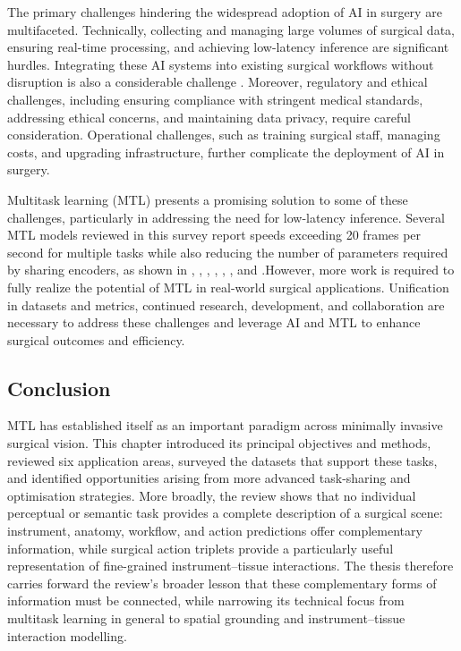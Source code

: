 The primary challenges hindering the widespread adoption of AI in surgery are multifaceted. Technically, collecting and managing large volumes of surgical data, ensuring real-time processing, and achieving low-latency inference are significant hurdles. Integrating these AI systems into existing surgical workflows without disruption is also a considerable challenge \citep{auloge2020augmented}. Moreover, regulatory and ethical challenges, including ensuring compliance with stringent medical standards, addressing ethical concerns, and maintaining data privacy, require careful consideration. Operational challenges, such as training surgical staff, managing costs, and upgrading infrastructure, further complicate the deployment of AI in surgery.

Multitask learning (MTL) presents a promising solution to some of these challenges, particularly in addressing the need for low-latency inference. Several MTL models reviewed in this survey report speeds exceeding 20 frames per second for multiple tasks while also reducing the number of parameters required by sharing encoders, as shown in , , , , , , and .However, more work is required to fully realize the potential of MTL in real-world surgical applications. Unification in datasets and metrics, continued research, development, and collaboration are necessary to address these challenges and leverage AI and MTL to enhance surgical outcomes and efficiency.

\subsection{Conclusion}
MTL has established itself as an important paradigm across minimally invasive surgical vision. This chapter introduced its principal objectives and methods, reviewed six application areas, surveyed the datasets that support these tasks, and identified opportunities arising from more advanced task-sharing and optimisation strategies. More broadly, the review shows that no individual perceptual or semantic task provides a complete description of a surgical scene: instrument, anatomy, workflow, and action predictions offer complementary information, while surgical action triplets provide a particularly useful representation of fine-grained instrument--tissue interactions. The thesis therefore carries forward the review's broader lesson that these complementary forms of information must be connected, while narrowing its technical focus from multitask learning in general to spatial grounding and instrument--tissue interaction modelling.

